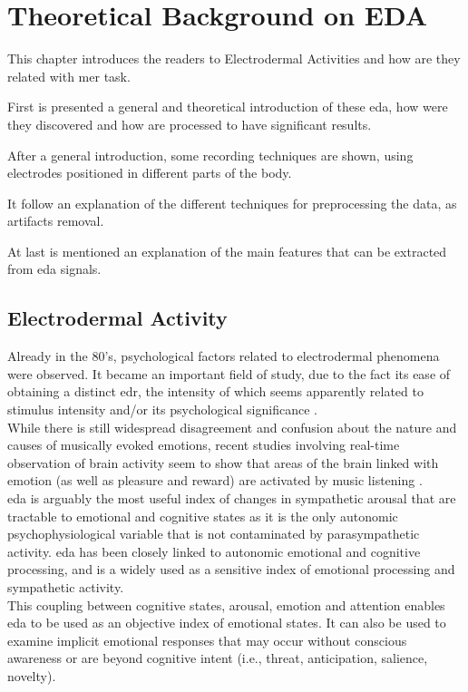 \chapter{Theoretical Background on EDA}
\label{chap:TheoreticalBackgroundEDA}
\pagestyle{plain}
\vspace{0.5cm}

\noindent This chapter introduces the readers to Electrodermal Activities and how are they related with \gls{mer} task.

First is presented a general and theoretical introduction of these \gls{eda}, how were they discovered and how are processed to have significant results.

After a general introduction, some recording techniques are shown, using electrodes positioned in different parts of the body.

It follow an explanation of the different techniques for preprocessing the data, as artifacts removal.

At last is mentioned an explanation of the main features that can be extracted from \gls{eda} signals.

\section{Electrodermal Activity}
Already in the 80's, psychological factors related to electrodermal phenomena were observed. It became an important field of study, due to the fact its ease of obtaining a distinct \gls{edr}, the intensity of which seems apparently related to stimulus intensity and/or its psychological significance \cite{boucsein2012electrodermal}.
\\ \indent
While there is still widespread disagreement and confusion about the nature and causes of musically evoked emotions, recent studies involving real-time observation of brain activity seem to show that areas of the brain linked with emotion (as well as pleasure and reward) are activated by music listening \cite{trost2012mapping}.
\\ \indent
\gls{eda} is arguably the most useful index of changes in sympathetic arousal that are tractable to emotional and cognitive states as it is the only autonomic psychophysiological variable that is not contaminated by parasympathetic activity. \gls{eda} has been closely linked to autonomic emotional and cognitive processing, and is a widely used as a sensitive index of emotional processing and sympathetic activity.
\\
This coupling between cognitive states, arousal, emotion and attention enables \gls{eda}  to be used as an objective index of emotional states. It can also be used to examine implicit emotional responses that may occur without conscious awareness or are beyond cognitive intent (i.e., threat, anticipation, salience, novelty).

